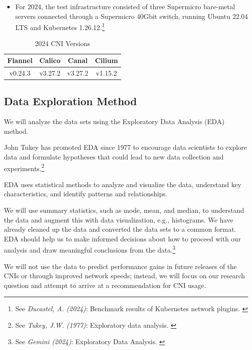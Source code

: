 \begin{itemize}
    \item For 2024, the test infrastructure consisted of three Supermicro bare-metal servers connected through a Supermicro 40Gbit switch, running Ubuntu 22.04 LTS and Kubernetes 1.26.12.\footnote{See \textit{Ducastel, A. (2024)}: Benchmark results of Kubernetes network plugins. \cite{originalArticle}}
\end{itemize}

\begin{table}[H]
\caption{2024 CNI Versions}
\begin{tabular}{|c | c | c | c |} 
 \hline
 Flannel & Calico & Canal & Cilium \\
 \hline
 v0.24.3 & v3.27.2 & v3.27.2 & v1.15.2 \\ 
 \hline
\end{tabular}
\label{tab:2024ver}
\end{table}

\subsection{Data Exploration Method}

We will analyze the data sets using the Exploratory Data Analysis (EDA) method.

John Tukey has promoted EDA since 1977 to encourage data scientists to explore data and formulate hypotheses that could lead to new data collection and experiments.\footnote{See \textit{Tukey, J.W. (1977)}: Exploratory data analysis. \cite{exploratoryDA}}

EDA uses statistical methods to analyze and visualize the data, understand key characteristics, and identify patterns and relationships. 

We will use summary statistics, such as mode, mean, and median, to understand the data and augment this with data visualization, e.g., histograms. We have already cleaned up the data and converted the data sets to a common format. EDA should help us to make informed decisions about how to proceed with our analysis and draw meaningful conclusions from the data.\footnote{See \textit{Gemini (2024)}: Exploratory Data Analysis. \cite{bardExploratory}}  

We will not use the data to predict performance gains in future releases of the CNIs or through improved network speeds; instead, we will focus on our research question and attempt to arrive at a recommendation for CNI usage.

